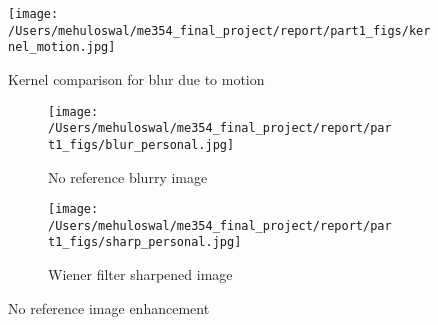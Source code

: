 \begin{figure}[h!]
  \centering
                \centering
                \texttt{[image: /Users/mehuloswal/me354\_final\_project/report/part1\_figs/kernel\_motion.jpg]}
                \caption{Kernel comparison for blur due to motion}
                \end{figure}

\begin{figure}
        \centering
        \begin{subfigure}[b]{0.4\textwidth}
                \centering
                \texttt{[image: /Users/mehuloswal/me354\_final\_project/report/part1\_figs/blur\_personal.jpg]}
                \caption{No reference blurry image}
                
        \end{subfigure}
        \begin{subfigure}[b]{0.4\textwidth}
                \centering
                \texttt{[image: /Users/mehuloswal/me354\_final\_project/report/part1\_figs/sharp\_personal.jpg]}
                \caption{Wiener filter sharpened image} 
        \end{subfigure}
\caption{No reference image enhancement}
\end{figure}

\newpage